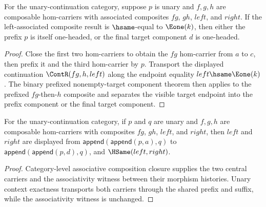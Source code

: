 \begin{theorem}
\label{thm:functor-prefix-hom-carrier-comp-assoc-nonempty-result-target-component-e1-cases}
For the unary-continuation category, suppose \(p\) is unary and \(f,g,h\)
are composable hom-carriers with associated composites \(fg\), \(gh\),
\(left\), and \(right\). If the left-associated composite result is
\(\hsame\)-equal to \(\Eone(k)\), then either the prefix \(p\) is itself
one-headed, or the final target component \(d\) is one-headed.
\end{theorem}
\begin{proof}
Close the first two hom-carriers to obtain the \(fg\) hom-carrier from \(a\)
to \(c\), then prefix it and the third hom-carrier by \(p\). Transport the
displayed continuation \(\ContR(fg,h,left)\) along the endpoint equality
\(left\hsame\Eone(k)\). The binary prefixed nonempty-target component theorem
then applies to the prefixed \(fg\)-then-\(h\) composite and separates the
visible target endpoint into the prefix component or the final target
component.
\end{proof}

\begin{theorem}
\label{thm:functor-prefix-hom-carrier-unary-suffix-assoc-preserves}
For the unary-continuation category, if $p$ and $q$ are unary and $f,g,h$ are
composable hom-carriers with composites $fg$, $gh$, $left$, and $right$, then
$left$ and $right$ are displayed from
$\mathsf{append}(\mathsf{append}(p,a),q)$ to
$\mathsf{append}(\mathsf{append}(p,d),q)$, and $\HSame(left,right)$.
\end{theorem}
\begin{proof}
Category-level associative composition closure supplies the two central
carriers and the associativity witness between their morphism histories. Unary
context exactness transports both carriers through the shared prefix and
suffix, while the associativity witness is unchanged.
\end{proof}

